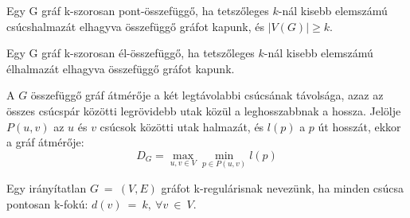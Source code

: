 

  \begin{definition} 
    Egy G gráf k-szorosan pont-összefüggő, ha tetszőleges $k$-nál kisebb elemszámú csúcshalmazát elhagyva összefüggő gráfot kapunk, és $|V(G)| \geq k$.
  \end{definition}

  \begin{definition} 
    Egy G gráf k-szorosan él-összefüggő, ha tetszőleges $k$-nál kisebb elemszámú élhalmazát elhagyva összefüggő gráfot kapunk.
  \end{definition}

  \begin{definition} 
    A $G$ összefüggő gráf átmérője a két legtávolabbi csúcsának távolsága, azaz az összes csúcspár közötti legrövidebb utak közül a leghosszabbnak a hossza. Jelölje $P(u, v)$ az $u$ és $v$ csúcsok közötti utak halmazát, és $l(p)$ a $p$ út hosszát, ekkor a gráf átmérője:\\
    $$D_G = \max_{u,v \in V} \min_{p \in P(u,v)} l(p)$$
  \end{definition}

  \begin{definition} 
    Egy irányítatlan $G~=~(V,E)$ gráfot k-regulárisnak nevezünk, ha minden csúcsa pontosan k-fokú:
    $d(v)~=~k,~\forall v~\in~V.$
  \end{definition}


